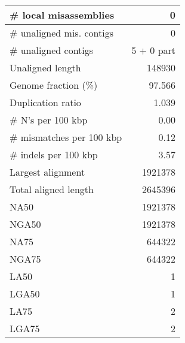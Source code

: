 \documentclass[12pt,a4paper]{article}
\begin{document}
\begin{table}[ht]
\begin{center}
\begin{tabular}{|l*{1}{|r}|}
\# local misassemblies & 0 \\ \hline
\# unaligned mis. contigs & 0 \\ \hline
\# unaligned contigs & 5 + 0 part \\ \hline
Unaligned length & 148930 \\ \hline
Genome fraction (\%) & 97.566 \\ \hline
Duplication ratio & 1.039 \\ \hline
\# N's per 100 kbp & 0.00 \\ \hline
\# mismatches per 100 kbp & 0.12 \\ \hline
\# indels per 100 kbp & 3.57 \\ \hline
Largest alignment & 1921378 \\ \hline
Total aligned length & 2645396 \\ \hline
NA50 & 1921378 \\ \hline
NGA50 & 1921378 \\ \hline
NA75 & 644322 \\ \hline
NGA75 & 644322 \\ \hline
LA50 & 1 \\ \hline
LGA50 & 1 \\ \hline
LA75 & 2 \\ \hline
LGA75 & 2 \\ \hline
\end{tabular}
\end{center}
\end{table}
\end{document}
